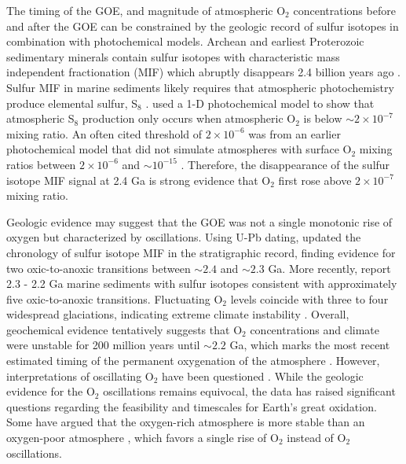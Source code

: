 The timing of the GOE, and magnitude of atmospheric O$_2$ concentrations before and after the GOE can be constrained by the geologic record of sulfur isotopes in combination with photochemical models. Archean and earliest Proterozoic sedimentary minerals contain sulfur isotopes with characteristic mass independent fractionation (MIF) which abruptly disappears 2.4 billion years ago \citep{Warke_2020}. Sulfur MIF in marine sediments likely requires that atmospheric photochemistry produce elemental sulfur, S$_8$ \citep[for explanation, see the introduction in][]{Zahnle_2006} \citep{Pavlov_2002,Farquhar_2000}. \citet{Zahnle_2006} used a 1-D photochemical model to show that atmospheric S$_8$ production only occurs when atmospheric O$_2$ is below $\sim 2 \times 10^{-7}$ mixing ratio. An often cited threshold of $2 \times 10^{-6}$ was from an earlier photochemical model that did not simulate atmospheres with surface O$_2$ mixing ratios between $2 \times 10^{-6}$ and $\sim 10^{-15}$ \citep{Pavlov_2002}. Therefore, the disappearance of the sulfur isotope MIF signal at 2.4 Ga is strong evidence that O$_2$ first rose above $2 \times 10^{-7}$ mixing ratio.

Geologic evidence may suggest that the GOE was not a single monotonic rise of oxygen but characterized by oscillations. Using U-Pb dating, \citet{Gumsley_2017} updated the chronology of sulfur isotope MIF in the stratigraphic record, finding evidence for two oxic-to-anoxic transitions between $\sim 2.4$ and $\sim 2.3$ Ga. More recently, \citet{Poulton_2021} report 2.3 - 2.2 Ga marine sediments with sulfur isotopes consistent with approximately five oxic-to-anoxic transitions. Fluctuating O$_2$ levels coincide with three to four widespread glaciations, indicating extreme climate instability \citep{Rasmussen_2013}. Overall, geochemical evidence tentatively suggests that O$_2$ concentrations and climate were unstable for 200 million years until $\sim 2.2$ Ga, which marks the most recent estimated timing of the permanent oxygenation of the atmosphere \citep{Poulton_2021}. However, interpretations of oscillating O$_2$ have been questioned \citep{Izon_2022}. While the geologic evidence for the O$_2$ oscillations remains equivocal, the data has raised significant questions regarding the feasibility and timescales for Earth's great oxidation. Some have argued that the oxygen-rich atmosphere is more stable than an oxygen-poor atmosphere \citep{Goldblatt_2006}, which favors a single rise of O$_2$ instead of O$_2$ oscillations.

